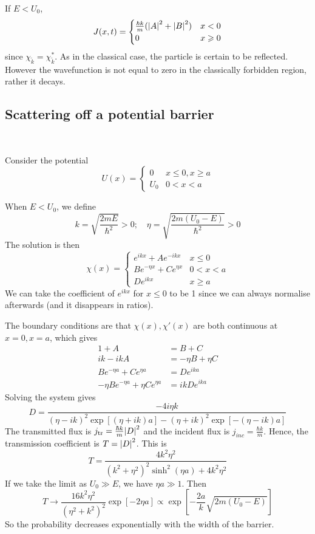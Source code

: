\documentclass[a4paper,11pt]{article}
\begin{document}
If \( E < U_0 \),
\[
	J(x,t) =
	\begin{cases}
		\frac{\hbar k}{m} (\abs{A}^2 + \abs{B}^2) & x < 0    \\
		0                                         & x \geqslant 0
	\end{cases}
\]
since \( \chi_{\tilde k} = \chi_{\tilde k}^* \).
As in the classical case, the particle is certain to be reflected. However the wavefunction is not equal to zero in the classically forbidden region, rather it decays. 

\subsection{Scattering off a potential barrier}\ \vspace{-1.5em}
\begin{example}
    Consider the potential
\[
	U(x) = \begin{cases}
		0   & x \leq 0, x \geq a \\
		U_0 & 0 < x < a
	\end{cases}
\]
\end{example}
When \( E < U_0 \), we define
\[
	k = \sqrt{\frac{2mE}{\hbar^2}} > 0;\quad \eta = \sqrt{\frac{2m(U_0 - E)}{\hbar^2}} > 0
\]
The solution is then
\[
	\chi(x) = \begin{cases}
		e^{ikx} + Ae^{-ikx}        & x \leq 0  \\
		Be^{-\eta x} + Ce^{\eta x} & 0 < x < a \\
		De^{ikx}                   & x \geq a
	\end{cases}
\]
We can take the coefficient of $e^{ikx}$ for $x\le 0$ to be 1 since we can always normalise afterwards (and it disappears in ratios). 

The boundary conditions are that \( \chi(x) , \chi'(x) \) are both continuous at \( x = 0, x = a \), which gives
\begin{align*}
    1 + A &= B + C\\ 
    ik - ikA &= -\eta B + \eta C\\ 
	B e^{-\eta a} + C e^{\eta a} &= D e^{ika}\\ 
    -\eta B e^{-\eta a} + \eta C e^{\eta a} &= ikD e^{ika}
\end{align*}
Solving the system gives
\[
	D = \frac{-4 i \eta k}{(\eta-ik)^2 \exp[(\eta+ik)a] - (\eta+ik)^2\exp[-(\eta-ik)a]}
\]
The transmitted flux is \( j_{\text{tr}} = \frac{\hbar k}{m} \abs{D}^2 \) and the incident flux is \( j_{\textit{inc}} = \frac{\hbar k}{m} \).
Hence, the transmission coefficient is \( T = \abs{D}^2 \).
This is
\[
	T = \frac{4 k^2 \eta^2}{(k^2+\eta^2)^2 \sinh^2(\eta a) + 4 k^2 \eta^2}
\]
If we take the limit as \( U_0 \gg E \), we have \( \eta a \gg 1 \).
Then
\[
	T \to \frac{16k^2 \eta^2}{(\eta^2 + k^2)^2} \exp[-2\eta a] \propto \exp[-\frac{2a}{k} \sqrt{2m(U_0 - E)}]
\]
So the probability decreases exponentially with the width of the barrier.
\end{document}
